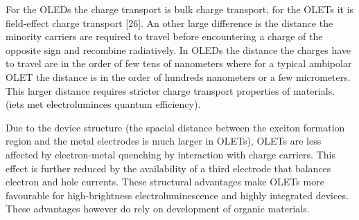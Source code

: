 For the OLEDs the charge transport is bulk charge transport, for the OLETs it is field-effect charge transport [26]. An other large difference is the distance the minority carriers are required to travel before encountering a charge of the opposite sign and recombine radiatively. In OLEDs the distance the charges have to travel are in the order of few tens of nanometers where for a typical ambipolar OLET the distance is in the order of hundreds nanometers or a few micrometers. This larger distance requires stricter charge transport properties of materials. (iets met electroluminces quantum efficiency).

Due to the device structure (the spacial distance between the exciton formation region and the metal electrodes is much larger in OLETs), OLETs are less affected by electron-metal quenching by interaction with charge carriers. This effect is further reduced by the availability of a third electrode that balances electron and hole currents. These structural advantages make OLETs more favourable for high-brightness electroluminescence and highly integrated devices. These advantages however do rely on development of organic materials.
